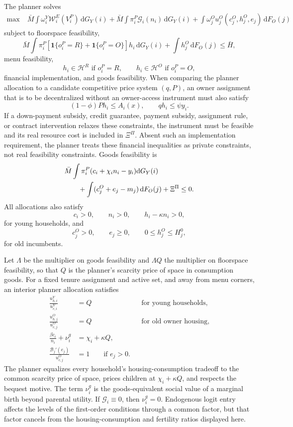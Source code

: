 \documentclass[11pt]{article}
\newcommand{\dd}{\mathrm d}
\newcommand{\1}{\mathbf 1}
\newcommand{\HH}{\mathcal H}
\begin{document}
The planner solves
\begin{align}
\max\; &
\bar M\int
\omega_i^Y\mathcal W_i^E(V_i^P)\,\dd G_Y(i)
+
\bar M\int
\pi_i^P\mathcal G_i(n_i)\,\dd G_Y(i)
+
\int
\omega_j^O u_j^O(c_j^O,h_j^O,e_j)\,\dd F_O(j)
\label{eq:compact_planner_problem}
\end{align}
subject to floorspace feasibility,
\[
\bar M\int \pi_i^P
\left[\1\{o_i^P=R\}+\1\{o_i^P=O\}\right]h_i\,\dd G_Y(i)
+\int h_j^O\,\dd F_O(j)\le \bar H,
\]
menu feasibility,
\[
h_i\in\HH^R\text{ if }o_i^P=R,
\qquad
h_i\in\HH^O\text{ if }o_i^P=O,
\]
financial implementation, and goods feasibility. When comparing the planner allocation to a candidate competitive price system $(q,P)$, an owner assignment that is to be decentralized without an owner-access instrument must also satisfy
\[
(1-\phi)P h_i\le A_i(x),
\qquad
q h_i\le \psi y_i.
\]
If a down-payment subsidy, credit guarantee, payment subsidy, assignment rule, or contract intervention relaxes these constraints, the instrument must be feasible and its real resource cost is included in $\Xi^\Pi$. Absent such an implementation requirement, the planner treats these financial inequalities as private constraints, not real feasibility constraints. Goods feasibility is
\begin{align*}
&\bar M\int
\pi_i^P
(c_i+\chi_i n_i-y_i)\dd G_Y(i)
\notag\\
&\qquad
+
\int(c_j^O+e_j-m_j)\,\dd F_O(j)
+\Xi^\Pi
\le0.
\end{align*}
All allocations also satisfy
\[
c_i>0,\qquad n_i>0,\qquad h_i-\kappa n_i>0,
\]
for young households, and
\[
c_j^O>0,\qquad e_j\ge0,\qquad 0\le h_j^O\le H_j^0,
\]
for old incumbents.

Let $\Lambda$ be the multiplier on goods feasibility and $\Lambda Q$ the multiplier on floorspace feasibility, so that $Q$ is the planner's scarcity price of space in consumption goods. For a fixed tenure assignment and active set, and away from menu corners, an interior planner allocation satisfies
\begin{align*}
\frac{u^Y_{h,i}}{u^Y_{c,i}}&=Q
&&\text{for young households},
\\
\frac{u^O_{h,j}}{u^O_{c,j}}&=Q
&&\text{for old owner housing},
\\
\frac{\beta c_i}{n_i}+\nu_i^g&=\chi_i+\kappa Q,
\\
\frac{\mathcal B_j'(e_j)}{u^O_{c,j}}&=1
\qquad \text{if }e_j>0.
\end{align*}
The planner equalizes every household's housing-consumption tradeoff to the common scarcity price of space, prices children at $\chi_i+\kappa Q$, and respects the bequest motive.
The term $\nu_i^g$ is the goods-equivalent social value of a marginal birth beyond parental utility. If $\mathcal G_i\equiv0$, then $\nu_i^g=0$.
Endogenous logit entry affects the levels of the first-order conditions through a common factor, but that factor cancels from the housing-consumption and fertility ratios displayed here.
\end{document}
